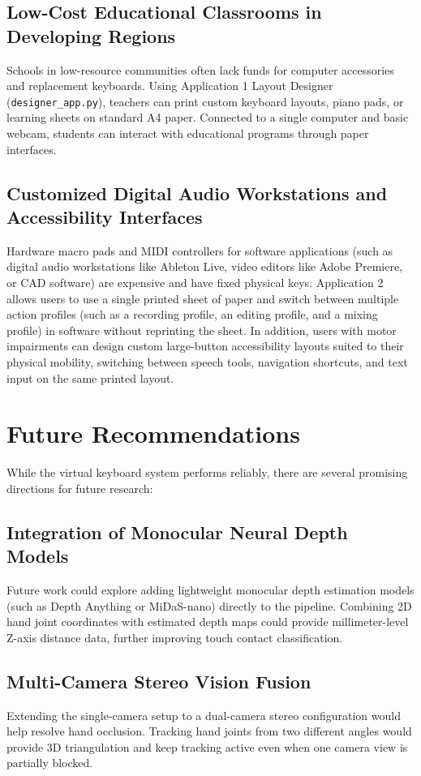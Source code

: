 \subsection{Low-Cost Educational Classrooms in Developing Regions}
Schools in low-resource communities often lack funds for computer accessories and replacement keyboards. Using Application 1 Layout Designer (\texttt{designer\_app.py}), teachers can print custom keyboard layouts, piano pads, or learning sheets on standard A4 paper. Connected to a single computer and basic webcam, students can interact with educational programs through paper interfaces.

\subsection{Customized Digital Audio Workstations and Accessibility Interfaces}
Hardware macro pads and MIDI controllers for software applications (such as digital audio workstations like Ableton Live, video editors like Adobe Premiere, or CAD software) are expensive and have fixed physical keys. Application 2 allows users to use a single printed sheet of paper and switch between multiple action profiles (such as a recording profile, an editing profile, and a mixing profile) in software without reprinting the sheet. In addition, users with motor impairments can design custom large-button accessibility layouts suited to their physical mobility, switching between speech tools, navigation shortcuts, and text input on the same printed layout.

\section{Future Recommendations}
\label{sec:concl_future}
While the virtual keyboard system performs reliably, there are several promising directions for future research:

\subsection{Integration of Monocular Neural Depth Models}
Future work could explore adding lightweight monocular depth estimation models (such as Depth Anything or MiDaS-nano) directly to the pipeline. Combining 2D hand joint coordinates with estimated depth maps could provide millimeter-level Z-axis distance data, further improving touch contact classification.

\subsection{Multi-Camera Stereo Vision Fusion}
Extending the single-camera setup to a dual-camera stereo configuration would help resolve hand occlusion. Tracking hand joints from two different angles would provide 3D triangulation and keep tracking active even when one camera view is partially blocked.

